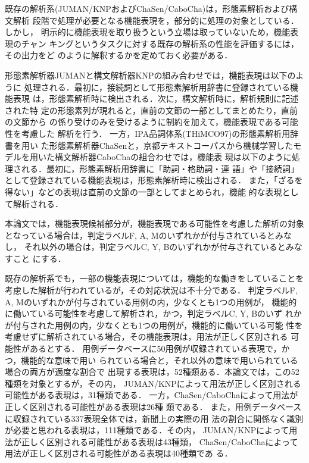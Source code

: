 \documentclass[japanese]{jnlp_1.2d}
\begin{document}
既存の解析系(JUMAN/KNPおよびChaSen/CaboCha)は，形態素解析および構文解析
段階で処理が必要となる機能表現を，部分的に処理の対象としている．しかし，
明示的に機能表現を取り扱うという立場は取っていないため，機能表現のチャン
キングというタスクに対する既存の解析系の性能を評価するには，その出力をど
のように解釈するかを定めておく必要がある．

形態素解析器JUMANと構文解析器KNPの組み合わせでは，機能表現は以下のように
処理される．最初に，接続詞として形態素解析用辞書に登録されている機能表現
は，形態素解析時に検出される．次に，構文解析時に，解析規則に記述された特
定の形態素列が現れると，直前の文節の一部としてまとめたり，直前の文節から
の係り受けのみを受けるように制約を加えて，機能表現である可能性を考慮した
解析を行う．
一方，IPA品詞体系(THiMCO97)の形態素解析用辞書\cite{ipadic-2.6.1}を用い
た形態素解析器ChaSenと，京都テキストコーパス\cite{京都大学テキストコーパ
ス}から機械学習したモデルを用いた構文解析器CaboChaの組合わせでは，機能表
現は以下のように処理される．最初に，形態素解析用辞書に「助詞・格助詞・連
語」や「接続詞」として登録されている機能表現は，形態素解析時に検出される．
また，「ざるを得ない」などの表現は直前の文節の一部としてまとめられ，機能
的な表現として解析される．

本論文では，機能表現候補部分が，機能表現である可能性を考慮した解析の対象
となっている場合は，判定ラベルF, A, Mのいずれかが付与されているとみなし，
それ以外の場合は，判定ラベルC, Y, Bのいずれかが付与されているとみなすこと
にする．

既存の解析系でも，一部の機能表現については，機能的な働きをしていることを
考慮した解析が行われているが，その対応状況は不十分である．
判定ラベルF, A, Mのいずれかが付与されている用例の内，少なくとも1つの用例が，
機能的に働いている可能性を考慮して解析され，かつ，判定ラベルC, Y, Bのいず
れかが付与された用例の内，少なくとも1つの用例が，機能的に働いている可能
性を考慮せずに解析されている場合，その機能表現は，用法が正しく区別される
可能性があるとする．
用例データベースに50用例が収録されている表現で，かつ，機能的な意味で用い
られている場合と，それ以外の意味で用いられている場合の両方が適度な割合で
出現する表現は，52種類ある．本論文では，この52種類を対象とするが，その内，
JUMAN/KNPによって用法が正しく区別される可能性がある表現は，31種類である．
一方，ChaSen/CaboChaによって用法が正しく区別される可能性がある表現は26種
類である．
また，用例データベースに収録されている337表現全体では，新聞上の実際の用
法の割合に関係なく識別が必要と思われる表現は，111種類である．その内，
JUMAN/KNPによって用法が正しく区別される可能性がある表現は43種類，
ChaSen/CaboChaによって用法が正しく区別される可能性がある表現は40種類であ
る．
\end{document}

